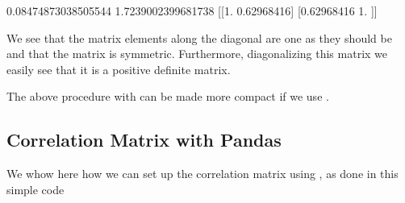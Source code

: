 \documentclass[letterpaper,10pt,english]{sphinxmanual}
\begin{document}
\begin{sphinxVerbatim}[commandchars=\\\{\}]
0.08474873038505544
1.7239002399681738
[[1.         0.62968416]
 [0.62968416 1.        ]]
\end{sphinxVerbatim}

We see that the matrix elements along the diagonal are one as they
should be and that the matrix is symmetric. Furthermore, diagonalizing
this matrix we easily see that it is a positive definite matrix.

The above procedure with  can be made more compact if we use .


\subsection{Correlation Matrix with Pandas}
\label{\detokenize{chapter8:correlation-matrix-with-pandas}}
We whow here how we can set up the correlation matrix using , as done in this simple code

\begin{sphinxVerbatim}[commandchars=\\\{\}]
   
   
  
  
    
  
    
   
  
  
\end{sphinxVerbatim}
\end{document}
